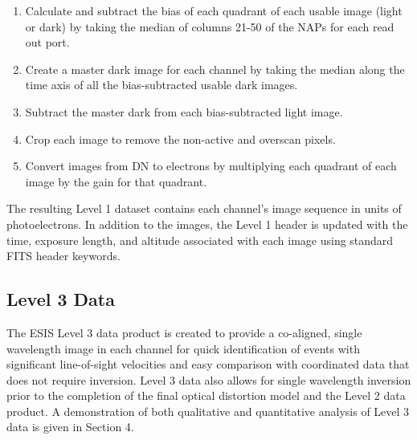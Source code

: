 \documentclass[linenumbers,trackchanges]{aastex63}
\begin{document}
\begin{enumerate}
    \item Calculate and subtract the bias of each quadrant of each usable image (light or dark) by taking the median of columns 21-50 of the NAPs for each read out port.   
    \item Create a master dark image for each channel by taking the median along the time axis of all the bias-subtracted usable dark images.
    \item Subtract the master dark from each bias-subtracted light image.
    \item Crop each image to remove the non-active and overscan pixels.
    \item Convert images from DN to electrons by multiplying each quadrant of each image by the gain for that quadrant.
\end{enumerate}
The resulting Level 1 dataset contains each channel's image sequence in units of photoelectrons.
In addition to the images, the Level 1 header is updated with the time, exposure length, and altitude associated with each image using standard FITS header keywords.   
	

\subsection{Level 3 Data} \label{sec:level 3}
 
    
\newcommand{\vigfit}{[.35, 0.28, 0.34, 0.6]}
\newcommand{\levthreetime}{18:08:46}

The ESIS Level 3 data product is created to provide a co-aligned, single wavelength image in each channel for quick identification of events with significant line-of-sight velocities and easy comparison with coordinated data that does not require inversion. 
Level 3 data also allows for single wavelength inversion prior to the completion of the final optical distortion model and the Level 2 data product.  A demonstration of both qualitative and quantitative analysis of Level 3 data is given in Section 4.  
\end{document}
